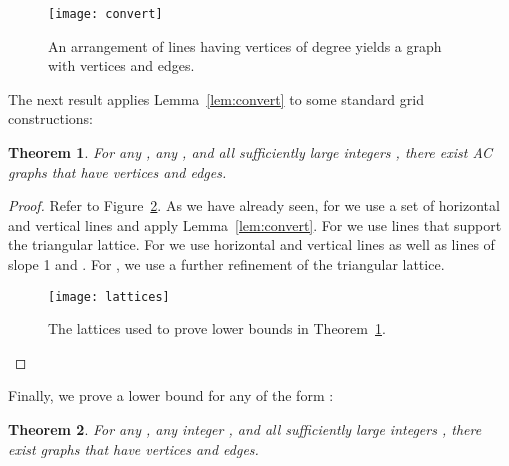 \documentclass{patmorin}
\newcommand{\figlabel}[1]{\label{fig:#1}}
\newcommand{\figref}[1]{\mbox{Figure~\ref{fig:#1}}}
\newtheorem{thm}{Theorem}
\newcommand{\thmref}[1]{Theorem~\ref{thm:#1}}
\newcommand{\lemref}[1]{Lemma~\ref{lem:#1}}
\begin{document}
\begin{figure}
  \begin{center}
    \texttt{[image: convert]}
  \end{center}
  \caption{An arrangement of  lines having  vertices of
           degree  yields a graph with  vertices and 
            edges.}
  \figlabel{convert}
\end{figure}

The next result applies \lemref{convert} to some standard grid
constructions:

\begin{thm}\label{thm:finite}
For any , any , and
all sufficiently large integers , there exist AC
graphs that have  vertices and  edges.
\end{thm}

\begin{proof}
Refer to \figref{lattices}.
As we have already seen, for  we use a set of  horizontal
and vertical lines and apply \lemref{convert}.  For  we use
lines that support the triangular lattice.  For  we use
horizontal and vertical lines as well as lines of slope 1 and . For
, we use a further refinement of the triangular lattice.
\begin{figure}
  \begin{center}
    \texttt{[image: lattices]}
  \end{center}
  \caption{The lattices used to prove lower bounds in \thmref{finite}.}
  \figlabel{lattices}
\end{figure}
\end{proof}

Finally, we prove a lower bound for any  of the form
:
\begin{thm}
For any , any integer , and all sufficiently large
integers , there exist  graphs that have 
vertices and  edges.
\end{thm}
\end{document}
